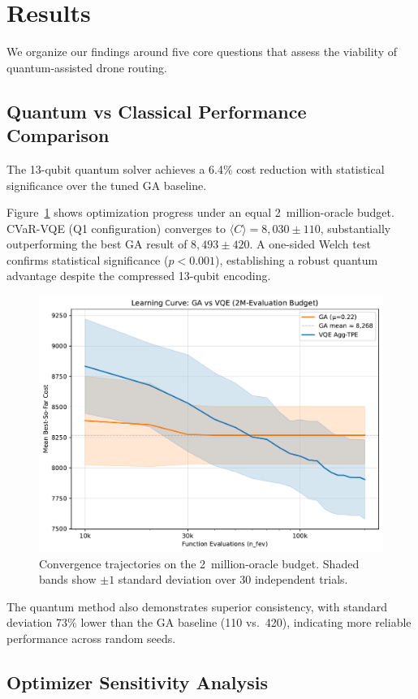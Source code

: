 \section{Results}
\label{sec:results}

We organize our findings around five core questions that assess the viability 
of quantum-assisted drone routing.

\subsection{Quantum vs Classical Performance Comparison}

The 13-qubit quantum solver achieves a 6.4\% cost reduction with statistical 
significance over the tuned GA baseline.

Figure~\ref{fig:learning_curves} shows optimization progress under an equal
2~million-oracle budget. CVaR-VQE (Q1 configuration) converges to 
$\langle C\rangle=8{,}030\pm110$, substantially outperforming the best GA result 
of $8{,}493\pm420$. A one-sided Welch test confirms statistical significance 
($p<0.001$), establishing a robust quantum advantage despite the compressed 
13-qubit encoding.

\begin{figure}[h]
  \centering
  \includegraphics[width=.7\linewidth]{fig/learning_curves_comparison.pdf}
  \caption{Convergence trajectories on the 2~million-oracle budget. 
           Shaded bands show $\pm1$ standard deviation over 30 independent trials.}
  \label{fig:learning_curves}
\end{figure}

The quantum method also demonstrates superior consistency, with standard deviation 
73\% lower than the GA baseline (110 vs.\ 420), indicating more reliable 
performance across random seeds.

\subsection{Optimizer Sensitivity Analysis}

